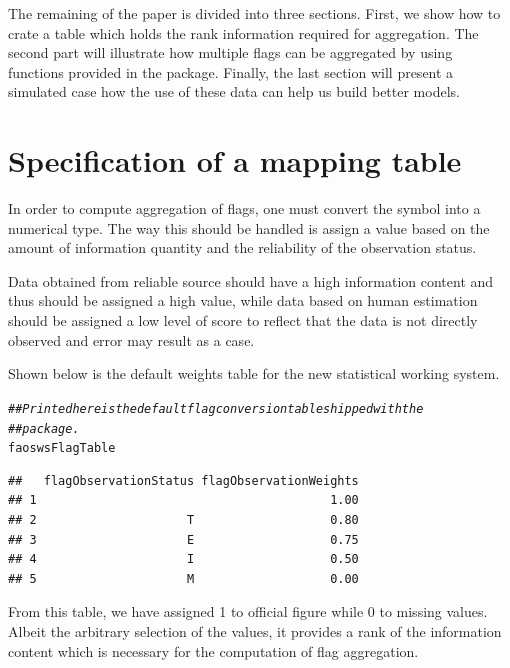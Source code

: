 \documentclass[nojss]{jss}\usepackage[]{graphicx}\usepackage[]{color}
\makeatletter
\newcommand{\hlcom}[1]{\textcolor[rgb]{0.678,0.584,0.686}{\textit{#1}}}%
\newcommand{\hlstd}[1]{\textcolor[rgb]{0.345,0.345,0.345}{#1}}%
\newenvironment{kframe}{%
 \def\at@end@of@kframe{}%
 \ifinner\ifhmode%
  \def\at@end@of@kframe{\end{minipage}}%
  \begin{minipage}{\columnwidth}%
 \fi\fi%
 \def\FrameCommand##1{\hskip\@totalleftmargin \hskip-\fboxsep
 \colorbox{shadecolor}{##1}\hskip-\fboxsep
     \hskip-\linewidth \hskip-\@totalleftmargin \hskip\columnwidth}%
 \MakeFramed {\advance\hsize-\width
   \@totalleftmargin\z@ \linewidth\hsize
   \@setminipage}}%
 {\par\unskip\endMakeFramed%
 \at@end@of@kframe}
\newenvironment{knitrout}{}{} %
\makeatother
\begin{document}
The remaining of the paper is divided into three sections. First, we
show how to crate a table which holds the rank information required
for aggregation. The second part will illustrate how multiple flags
can be aggregated by using functions provided in the package. Finally,
the last section will present a simulated case how the use of these
data can help us build better models.


\section{Specification of a mapping table}

In order to compute aggregation of flags, one must convert the symbol
into a numerical type. The way this should be handled is assign a
value based on the amount of information quantity and the reliability
of the observation status.

Data obtained from reliable source should have a high information
content and thus should be assigned a high value, while data based on
human estimation should be assigned a low level of score to reflect
that the data is not directly observed and error may result as a case.

Shown below is the default weights table for the new statistical
working system.

\begin{knitrout}
\color{fgcolor}\begin{kframe}
\begin{alltt}
\hlcom{## Printed here is the default flag conversion table shipped with the}
\hlcom{## package.}
\hlstd{faoswsFlagTable}
\end{alltt}
\begin{verbatim}
##   flagObservationStatus flagObservationWeights
## 1                                         1.00
## 2                     T                   0.80
## 3                     E                   0.75
## 4                     I                   0.50
## 5                     M                   0.00
\end{verbatim}
\end{kframe}
\end{knitrout}

From this table, we have assigned 1 to official figure while 0 to
missing values. Albeit the arbitrary selection of the values, it
provides a rank of the information content which is necessary for the
computation of flag aggregation.
\end{document}
